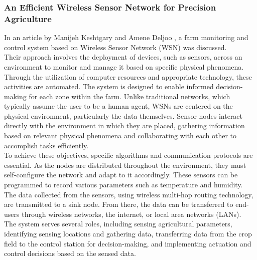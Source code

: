 \documentclass[12pt, a4paper]{article}
\begin{document}
\subsubsection{An Efficient Wireless Sensor Network for Precision Agriculture}
In an article by Manijeh Keshtgary and Amene Deljoo \cite{keshtgary2012efficient}, a farm monitoring and control system based on Wireless Sensor Network (WSN) was discussed.\\
Their approach involves the deployment of devices, such as sensors, across an environment to monitor and manage it based on specific physical phenomena. Through the utilization of computer resources and appropriate technology, these activities are automated. The system is designed to enable informed decision-making for each zone within the farm. Unlike traditional networks, which typically assume the user to be a human agent, WSNs are centered on the physical environment, particularly the data themselves. Sensor nodes interact directly with the environment in which they are placed, gathering information based on relevant physical phenomena and collaborating with each other to accomplish tasks efficiently.\\
To achieve these objectives, specific algorithms and communication protocols are essential. As the nodes are distributed throughout the environment, they must self-configure the network and adapt to it accordingly. These sensors can be programmed to record various parameters such as temperature and humidity. The data collected from the sensors, using wireless multi-hop routing technology, are transmitted to a sink node. From there, the data can be transferred to end-users through wireless networks, the internet, or local area networks (LANs).\\
The system serves several roles, including sensing agricultural parameters, identifying sensing locations and gathering data, transferring data from the crop field to the control station for decision-making, and implementing actuation and control decisions based on the sensed data.
\end{document}
